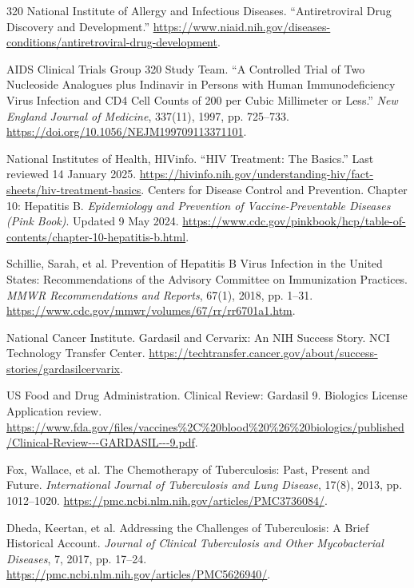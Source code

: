 \documentclass[12pt,oneside]{book}
\begin{document}
\begin{thebibliography}{320}
National Institute of Allergy and Infectious Diseases. ``Antiretroviral
Drug Discovery and Development.''
\url{https://www.niaid.nih.gov/diseases-conditions/antiretroviral-drug-development}.

AIDS Clinical Trials Group 320 Study Team. ``A Controlled Trial of Two
Nucleoside Analogues plus Indinavir in Persons with Human Immunodeficiency
Virus Infection and CD4 Cell Counts of 200 per Cubic Millimeter or Less.''
\emph{New England Journal of Medicine}, 337(11), 1997, pp. 725--733.
\url{https://doi.org/10.1056/NEJM199709113371101}.

National Institutes of Health, HIVinfo. ``HIV Treatment: The Basics.''
Last reviewed 14 January 2025.
\url{https://hivinfo.nih.gov/understanding-hiv/fact-sheets/hiv-treatment-basics}.
Centers for Disease Control and Prevention. Chapter 10: Hepatitis B.
\emph{Epidemiology and Prevention of Vaccine-Preventable Diseases (Pink Book)}.
Updated 9 May 2024.
\url{https://www.cdc.gov/pinkbook/hcp/table-of-contents/chapter-10-hepatitis-b.html}.

Schillie, Sarah, et al. Prevention of Hepatitis B Virus Infection in the
United States: Recommendations of the Advisory Committee on Immunization
Practices. \emph{MMWR Recommendations and Reports}, 67(1), 2018, pp. 1--31.
\url{https://www.cdc.gov/mmwr/volumes/67/rr/rr6701a1.htm}.

National Cancer Institute. Gardasil and Cervarix: An NIH Success Story.
NCI Technology Transfer Center.
\url{https://techtransfer.cancer.gov/about/success-stories/gardasilcervarix}.

US Food and Drug Administration. Clinical Review: Gardasil 9.
Biologics License Application review.
\url{https://www.fda.gov/files/vaccines%2C%20blood%20%26%20biologics/published/Clinical-Review---GARDASIL---9.pdf}.

Fox, Wallace, et al. The Chemotherapy of Tuberculosis: Past, Present and
Future. \emph{International Journal of Tuberculosis and Lung Disease},
17(8), 2013, pp. 1012--1020.
\url{https://pmc.ncbi.nlm.nih.gov/articles/PMC3736084/}.

Dheda, Keertan, et al. Addressing the Challenges of Tuberculosis: A Brief
Historical Account. \emph{Journal of Clinical Tuberculosis and Other
Mycobacterial Diseases}, 7, 2017, pp. 17--24.
\url{https://pmc.ncbi.nlm.nih.gov/articles/PMC5626940/}.


\end{thebibliography}
\end{document}
